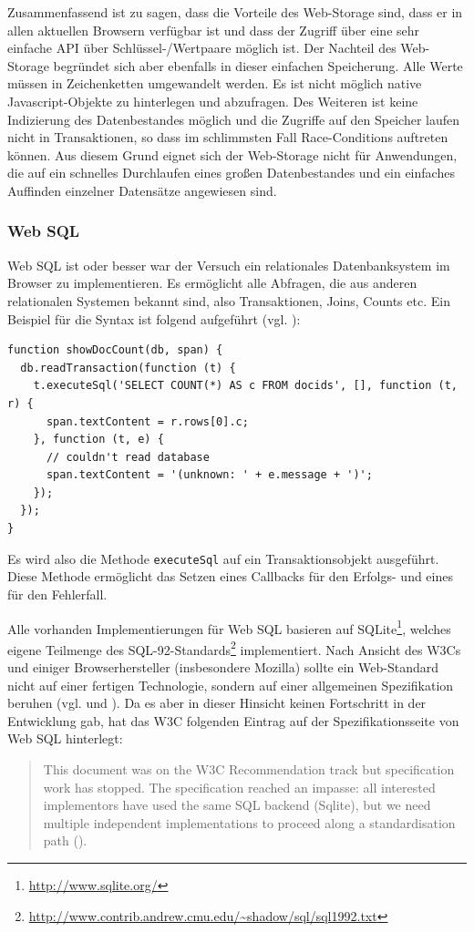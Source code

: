 Zusammenfassend ist zu sagen, dass die Vorteile des Web-Storage sind, dass er in allen aktuellen Browsern verfügbar ist und dass der Zugriff über eine sehr einfache API über Schlüssel-/Wertpaare möglich ist. Der Nachteil des Web-Storage begründet sich aber ebenfalls in dieser einfachen Speicherung. Alle Werte müssen in Zeichenketten umgewandelt werden. Es ist nicht möglich native Javascript-Objekte zu hinterlegen und abzufragen. Des Weiteren ist keine Indizierung des Datenbestandes möglich und die Zugriffe auf den Speicher laufen nicht in Transaktionen, so dass im schlimmsten Fall Race-Conditions auftreten können. Aus diesem Grund eignet sich der Web-Storage nicht für Anwendungen, die auf ein schnelles Durchlaufen eines großen Datenbestandes und ein einfaches Auffinden einzelner Datensätze angewiesen sind.

\subsubsection*{Web SQL}
Web SQL ist oder besser war der Versuch ein relationales Datenbanksystem im Browser zu implementieren. Es ermöglicht alle Abfragen, die aus anderen relationalen Systemen bekannt sind, also Transaktionen, Joins, Counts etc. Ein Beispiel für die Syntax ist folgend aufgeführt (vgl. \cite{W3C2010}):
\begin{lstlisting}
function showDocCount(db, span) {
  db.readTransaction(function (t) {
    t.executeSql('SELECT COUNT(*) AS c FROM docids', [], function (t, r) {
      span.textContent = r.rows[0].c;
    }, function (t, e) {
      // couldn't read database
      span.textContent = '(unknown: ' + e.message + ')';
    });
  });
}
\end{lstlisting}
Es wird also die Methode \texttt{executeSql} auf ein Transaktionsobjekt ausgeführt. Diese Methode ermöglicht das Setzen eines Callbacks für den Erfolgs- und eines für den Fehlerfall. 

Alle vorhanden Implementierungen für Web SQL basieren auf SQLite\footnote{\url{http://www.sqlite.org/}}, welches eigene Teilmenge des SQL-92-Standards\footnote{\url{http://www.contrib.andrew.cmu.edu/~shadow/sql/sql1992.txt}} implementiert. Nach Ansicht des W3Cs und einiger Browserhersteller (insbesondere Mozilla) sollte ein Web-Standard nicht auf einer fertigen Technologie, sondern auf einer allgemeinen Spezifikation beruhen (vgl. \cite{W3C2010} und \cite{Ranganathan2010}). Da es aber in dieser Hinsicht keinen Fortschritt in der Entwicklung gab, hat das W3C folgenden Eintrag auf der Spezifikationsseite von Web SQL hinterlegt:
\begin{quotation}
 This document was on the W3C Recommendation track but specification work has stopped. The specification reached an impasse: all interested implementors have used the same SQL backend (Sqlite), but we need multiple independent implementations to proceed along a standardisation path (\cite{W3C2010}).
\end{quotation} 

